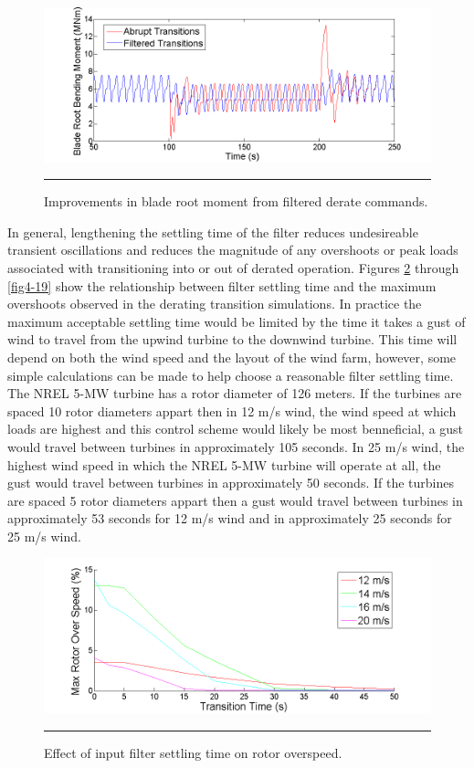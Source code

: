 \begin{figure}[htbp]
	\centering
		\includegraphics[trim = {1cm 0 2cm 0}, clip, width = \linewidth]{Figures/ch4Figures/fig4-16.png}
		\rule{35em}{0.5pt}
	\caption{Improvements in blade root moment from filtered derate commands.}
	\label{fig4-16}
\end{figure}


In general, lengthening the settling time of the filter reduces undesireable transient oscillations and reduces the magnitude of any overshoots or peak loads associated with transitioning into or out of derated operation. Figures \ref{fig4-17} through \ref{fig4-19} show the relationship between filter settling time and the maximum overshoots observed in the derating transition simulations. In practice the maximum acceptable settling time would be limited by the time it takes a gust of wind to travel from the upwind turbine to the downwind turbine. This time will depend on both the wind speed and the layout of the wind farm, however, some simple calculations can be made to help choose a reasonable filter settling time. The NREL 5-MW turbine has a rotor diameter of 126 meters. If the turbines are spaced 10 rotor diameters appart then in 12 m/s wind, the wind speed at which loads are highest and this control scheme would likely be most benneficial, a gust would travel between turbines in approximately 105 seconds. In 25 m/s wind, the highest wind speed in which the NREL 5-MW turbine will operate at all, the gust would travel between turbines in approximately 50 seconds. If the turbines are spaced 5 rotor diameters appart then a gust would travel between turbines in approximately 53 seconds for 12 m/s wind and in approximately 25 seconds for 25 m/s wind. 


\begin{figure}[htbp]
	\centering
		\includegraphics[trim = {1cm 0 2cm 0}, clip, width = \linewidth]{Figures/ch4Figures/fig4-17.png}
		\rule{35em}{0.5pt}
	\caption{Effect of input filter settling time on rotor overspeed.}
	\label{fig4-17}
\end{figure}

